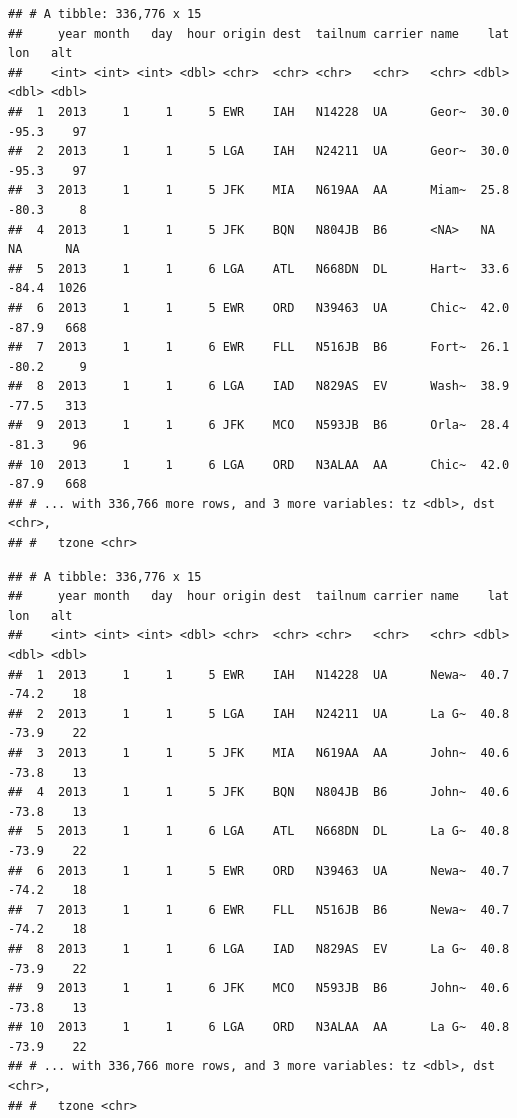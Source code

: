\documentclass[
]{article}
\newenvironment{Shaded}{\begin{snugshade}}{\end{snugshade}}
\newcommand{\KeywordTok}[1]{\textcolor[rgb]{0.13,0.29,0.53}{\textbf{#1}}}
\newcommand{\NormalTok}[1]{#1}
\newcommand{\OperatorTok}[1]{\textcolor[rgb]{0.81,0.36,0.00}{\textbf{#1}}}
\newcommand{\StringTok}[1]{\textcolor[rgb]{0.31,0.60,0.02}{#1}}
\begin{document}
\begin{verbatim}
## # A tibble: 336,776 x 15
##     year month   day  hour origin dest  tailnum carrier name    lat   lon   alt
##    <int> <int> <int> <dbl> <chr>  <chr> <chr>   <chr>   <chr> <dbl> <dbl> <dbl>
##  1  2013     1     1     5 EWR    IAH   N14228  UA      Geor~  30.0 -95.3    97
##  2  2013     1     1     5 LGA    IAH   N24211  UA      Geor~  30.0 -95.3    97
##  3  2013     1     1     5 JFK    MIA   N619AA  AA      Miam~  25.8 -80.3     8
##  4  2013     1     1     5 JFK    BQN   N804JB  B6      <NA>   NA    NA      NA
##  5  2013     1     1     6 LGA    ATL   N668DN  DL      Hart~  33.6 -84.4  1026
##  6  2013     1     1     5 EWR    ORD   N39463  UA      Chic~  42.0 -87.9   668
##  7  2013     1     1     6 EWR    FLL   N516JB  B6      Fort~  26.1 -80.2     9
##  8  2013     1     1     6 LGA    IAD   N829AS  EV      Wash~  38.9 -77.5   313
##  9  2013     1     1     6 JFK    MCO   N593JB  B6      Orla~  28.4 -81.3    96
## 10  2013     1     1     6 LGA    ORD   N3ALAA  AA      Chic~  42.0 -87.9   668
## # ... with 336,766 more rows, and 3 more variables: tz <dbl>, dst <chr>,
## #   tzone <chr>
\end{verbatim}

\begin{Shaded}
\end{Shaded}

\begin{verbatim}
## # A tibble: 336,776 x 15
##     year month   day  hour origin dest  tailnum carrier name    lat   lon   alt
##    <int> <int> <int> <dbl> <chr>  <chr> <chr>   <chr>   <chr> <dbl> <dbl> <dbl>
##  1  2013     1     1     5 EWR    IAH   N14228  UA      Newa~  40.7 -74.2    18
##  2  2013     1     1     5 LGA    IAH   N24211  UA      La G~  40.8 -73.9    22
##  3  2013     1     1     5 JFK    MIA   N619AA  AA      John~  40.6 -73.8    13
##  4  2013     1     1     5 JFK    BQN   N804JB  B6      John~  40.6 -73.8    13
##  5  2013     1     1     6 LGA    ATL   N668DN  DL      La G~  40.8 -73.9    22
##  6  2013     1     1     5 EWR    ORD   N39463  UA      Newa~  40.7 -74.2    18
##  7  2013     1     1     6 EWR    FLL   N516JB  B6      Newa~  40.7 -74.2    18
##  8  2013     1     1     6 LGA    IAD   N829AS  EV      La G~  40.8 -73.9    22
##  9  2013     1     1     6 JFK    MCO   N593JB  B6      John~  40.6 -73.8    13
## 10  2013     1     1     6 LGA    ORD   N3ALAA  AA      La G~  40.8 -73.9    22
## # ... with 336,766 more rows, and 3 more variables: tz <dbl>, dst <chr>,
## #   tzone <chr>
\end{verbatim}
\end{document}
